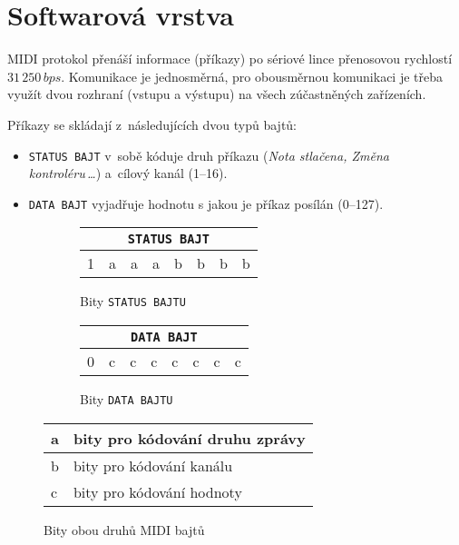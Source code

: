 \section{Softwarová vrstva}\label{chpt:MIDIsw}

\acs{MIDI} protokol přenáší informace (příkazy) po sériové lince přenosovou rychlostí $31\,250\,\unit{bps}$. Komunikace je jednosměrná, pro obousměrnou komunikaci je třeba využít dvou rozhraní (vstupu a výstupu) na všech zúčastněných zařízeních. %

Příkazy se skládají z~následujících dvou typů bajtů:
\begin{itemize}
    \item \texttt{STATUS~BAJT} v~sobě kóduje druh příkazu (\emph{Nota stlačena, Změna kontroléru\,\ldots}) a~cílový kanál (1--16). 
    \item \texttt{DATA~BAJT} vyjadřuje hodnotu s jakou je příkaz posílán (0--127).
\end{itemize}

\begin{figure}[h]
    \centering
    \begin{subfigure}{.4\textwidth}
        \centering
        \begin{tabular}{|c|c|c|c|c|c|c|c|}
            \hline
            \multicolumn{8}{|c|}{\texttt{STATUS BAJT}} \\
            \hline
            1 & a & a & a & b & b & b & b \\ 
            \hline
        \end{tabular}
        \caption{Bity \texttt{STATUS BAJTU}}
        \label{fig:StByteBits}
    \end{subfigure}
    \begin{subfigure}{.4\textwidth}
        \centering
        \begin{tabular}{|c|c|c|c|c|c|c|c|}
            \hline
            \multicolumn{8}{|c|}{\texttt{DATA BAJT}} \\
            \hline
            0 & c & c & c & c & c & c & c \\ 
            \hline
        \end{tabular}
        \caption{Bity \texttt{DATA BAJTU}}
        \label{fig:DtByteBits}
    \end{subfigure}
    \begin{tabular}{l|l}
         a & bity pro kódování druhu zprávy  \\
         \hline
         b & bity pro kódování kanálu \\
         \hline
         c & bity pro kódování hodnoty 
    \end{tabular}
    \caption{Bity obou druhů \acs{MIDI} bajtů \cite{MIDIspecs}}
    \label{fig:MIDIbits}
    
\end{figure}

